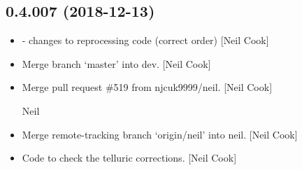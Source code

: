 \documentclass[a4paper,10pt,english]{report}
\begin{document}
\subsection{0.4.007 (2018-12-13)}
\label{\detokenize{misc/changelog:id237}}\begin{itemize}
\item {} 
 - changes to reprocessing code (correct order)
{[}Neil Cook{]}

\item {} 
Merge branch ‘master’ into dev. {[}Neil Cook{]}

\item {} 
Merge pull request \#519 from njcuk9999/neil. {[}Neil Cook{]}

Neil

\item {} 
Merge remote-tracking branch ‘origin/neil’ into neil. {[}Neil Cook{]}

\item {} 
Code to check the telluric corrections. {[}Neil Cook{]}

\end{itemize}
\end{document}
